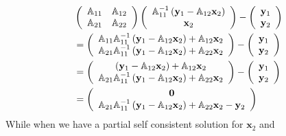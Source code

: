 \documentclass[aps,preprint]{revtex4}%
\begin{document}
\begin{align}
&  \left(
\begin{array}
[c]{cc}%
\mathbb{A}_{11} & \mathbb{A}_{12}\\
\mathbb{A}_{21} & \mathbb{A}_{22}%
\end{array}
\right)  \left(
\begin{array}
[c]{c}%
\mathbb{A}_{11}^{-1}\left(  \mathbf{y}_{1}-\mathbb{A}_{12}\mathbf{x}%
_{2}\right) \\
\mathbf{x}_{2}%
\end{array}
\right)  -\left(
\begin{array}
[c]{c}%
\mathbf{y}_{1}\\
\mathbf{y}_{2}%
\end{array}
\right) \nonumber\\
&  =\left(
\begin{array}
[c]{c}%
\mathbb{A}_{11}\mathbb{A}_{11}^{-1}\left(  \mathbf{y}_{1}-\mathbb{A}%
_{12}\mathbf{x}_{2}\right)  +\mathbb{A}_{12}\mathbf{x}_{2}\\
\mathbb{A}_{21}\mathbb{A}_{11}^{-1}\left(  \mathbf{y}_{1}-\mathbb{A}%
_{12}\mathbf{x}_{2}\right)  +\mathbb{A}_{22}\mathbf{x}_{2}%
\end{array}
\right)  -\left(
\begin{array}
[c]{c}%
\mathbf{y}_{1}\\
\mathbf{y}_{2}%
\end{array}
\right) \nonumber\\
&  =\left(
\begin{array}
[c]{c}%
\left(  \mathbf{y}_{1}-\mathbb{A}_{12}\mathbf{x}_{2}\right)  +\mathbb{A}%
_{12}\mathbf{x}_{2}\\
\mathbb{A}_{21}\mathbb{A}_{11}^{-1}\left(  \mathbf{y}_{1}-\mathbb{A}%
_{12}\mathbf{x}_{2}\right)  +\mathbb{A}_{22}\mathbf{x}_{2}%
\end{array}
\right)  -\left(
\begin{array}
[c]{c}%
\mathbf{y}_{1}\\
\mathbf{y}_{2}%
\end{array}
\right) \nonumber\\
&  =\left(
\begin{array}
[c]{c}%
\mathbf{0}\\
\mathbb{A}_{21}\mathbb{A}_{11}^{-1}\left(  \mathbf{y}_{1}-\mathbb{A}%
_{12}\mathbf{x}_{2}\right)  +\mathbb{A}_{22}\mathbf{x}_{2}-\mathbf{y}_{2}%
\end{array}
\right)  \label{baksub1}%
\end{align}
While when we have a partial self consistent solution for $\mathbf{x}_{2}$ and
\end{document}
